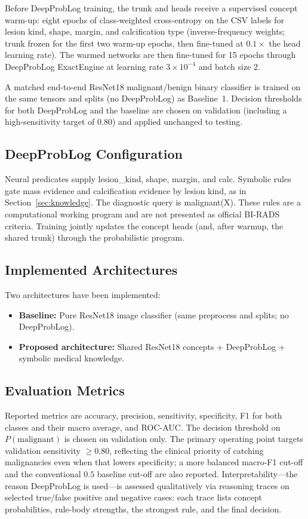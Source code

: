Before DeepProbLog training, the trunk and heads receive a supervised concept warm-up: eight epochs of class-weighted cross-entropy on the CSV labels for lesion kind, shape, margin, and calcification type (inverse-frequency weights; trunk frozen for the first two warm-up epochs, then fine-tuned at $0.1\times$ the head learning rate). The warmed networks are then fine-tuned for 15 epochs through DeepProbLog ExactEngine at learning rate $3\times 10^{-4}$ and batch size $2$.

A matched end-to-end ResNet18 malignant/benign binary classifier is trained on the same tensors and splits (no DeepProbLog) as Baseline~1. Decision thresholds for both DeepProbLog and the baseline are chosen on validation (including a high-sensitivity target of $0.80$) and applied unchanged to testing.

\subsection{DeepProbLog Configuration}
\label{sec:dplconfig}

Neural predicates supply lesion\_kind, shape, margin, and calc. Symbolic rules gate mass evidence and calcification evidence by lesion kind, as in Section~\ref{sec:knowledge}. The diagnostic query is malignant(X). These rules are a computational working program and are not presented as official BI-RADS criteria. Training jointly updates the concept heads (and, after warmup, the shared trunk) through the probabilistic program.

\subsection{Implemented Architectures}
\label{sec:Implemented Architectures}
Two architectures have been implemented:
\begin{itemize}
\item \textbf{Baseline:} Pure ResNet18 image classifier (same preprocess and splits; no DeepProbLog).

\item \textbf{Proposed architecture:} Shared ResNet18 concepts + DeepProbLog + symbolic medical knowledge.
\end{itemize}

\subsection{Evaluation Metrics}
\label{sec:metrics}

Reported metrics are accuracy, precision, sensitivity, specificity, F1 for both classes and their macro average, and ROC-AUC. The decision threshold on $P(\mathrm{malignant})$ is chosen on validation only. The primary operating point targets validation sensitivity $\geq 0.80$, reflecting the clinical priority of catching malignancies even when that lowers specificity; a more balanced macro-F1 cut-off and the conventional $0.5$ baseline cut-off are also reported. Interpretability---the reason DeepProbLog is used---is assessed qualitatively via reasoning traces on selected true/false positive and negative cases: each trace lists concept probabilities, rule-body strengths, the strongest rule, and the final decision.

